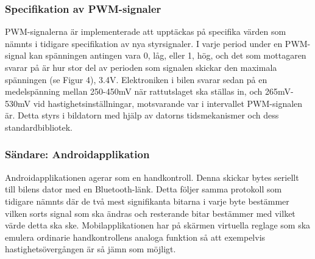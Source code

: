 \documentclass[a4paper]{article}
\begin{document}
\subsubsection{Specifikation av PWM-signaler}
PWM-signalerna är implementerade att upptäckas på specifika värden som nämnts i tidigare specifikation av nya styrsignaler. I varje period under en PWM-signal kan spänningen antingen vara 0, låg, eller 1, hög, och det som mottagaren svarar på är hur stor del av perioden som signalen skickar den maximala spänningen (se Figur 4), 3.4V. Elektroniken i bilen svarar sedan på en medelspänning mellan 250-450mV när rattutslaget ska ställas in, och 265mV-530mV vid hastighetsinställningar, motsvarande var i intervallet PWM-signalen är. Detta styrs i bildatorn med hjälp av datorns tidsmekanismer och dess standardbibliotek.

\subsubsection{Sändare: Androidapplikation}
Androidapplikationen agerar som en handkontroll. Denna skickar bytes seriellt till bilens dator med en Bluetooth-länk. Detta följer samma protokoll som tidigare nämnts där de två mest signifikanta bitarna i varje byte bestämmer vilken sorts signal som ska ändras och resterande bitar bestämmer med vilket värde detta ska ske. Mobilapplikationen har på skärmen virtuella reglage som ska emulera ordinarie handkontrollens analoga funktion så att exempelvis hastighetsövergången är så jämn som möjligt.
\end{document}
